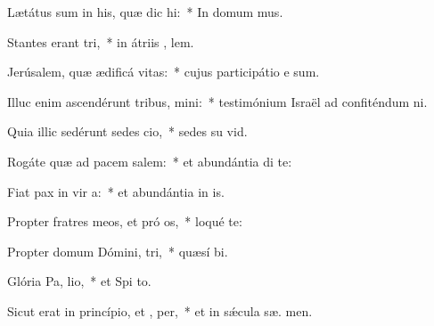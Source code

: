 \item Lætátus sum in his, quæ dic  hi:~* In domum  mus.
\item Stantes erant  tri,~* in átriis , lem.
\item Jerúsalem, quæ ædificá  vitas:~* cujus participátio e  sum.
\item Illuc enim ascendérunt tribus,  mini:~* testimónium Israël ad confiténdum  ni.
\item Quia illic sedérunt sedes  cio,~* sedes su  vid.
\item Rogáte quæ ad pacem  salem:~* et abundántia di te:
\item Fiat pax in vir a:~* et abundántia in  is.
\item Propter fratres meos, et pró os,~* loqué   te:
\item Propter domum Dómini,  tri,~* quæsí  bi.
\item Glória Pa,  lio,~* et Spi to.
\item Sicut erat in princípio, et ,  per,~* et in sǽcula sæ. men.
